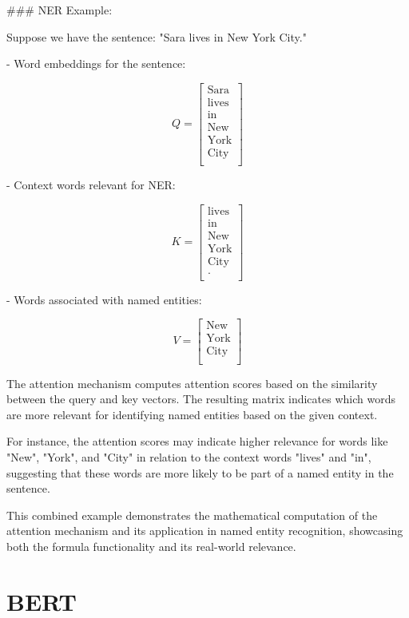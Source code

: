 ### NER Example:

Suppose we have the sentence: "Sara lives in New York City."

- Word embeddings for the sentence:

\[ Q = \begin{bmatrix} \text{Sara} \\ \text{lives} \\ \text{in} \\ \text{New} \\ \text{York} \\ \text{City} \\ \end{bmatrix} \]

- Context words relevant for NER:

\[ K = \begin{bmatrix} \text{lives} \\ \text{in} \\ \text{New} \\ \text{York} \\ \text{City} \\ \text{.} \\ \end{bmatrix} \]

- Words associated with named entities:

\[ V = \begin{bmatrix} \text{New} \\ \text{York} \\ \text{City} \\ \end{bmatrix} \]

The attention mechanism computes attention scores based on the similarity between the query and key vectors. The resulting matrix indicates which words are more relevant for identifying named entities based on the given context.

For instance, the attention scores may indicate higher relevance for words like "New", "York", and "City" in relation to the context words "lives" and "in", suggesting that these words are more likely to be part of a named entity in the sentence.

This combined example demonstrates the mathematical computation of the attention mechanism and its application in named entity recognition, showcasing both the formula functionality and its real-world relevance.

\newpage 
\section{BERT}

